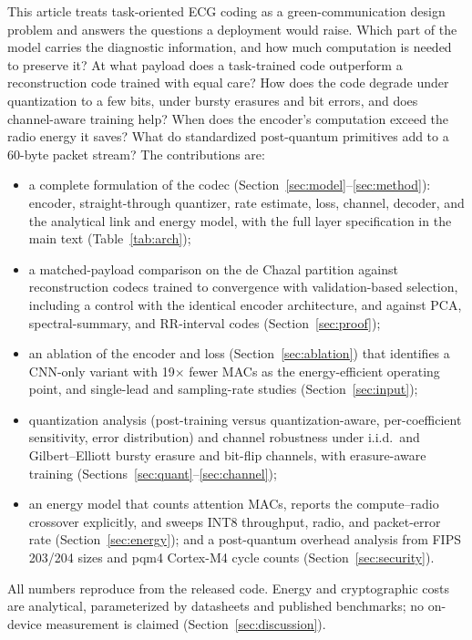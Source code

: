 \documentclass[journal]{IEEEtran}
\begin{document}
This article treats task-oriented ECG coding as a green-communication design problem and answers the questions a deployment would raise. Which part of the model carries the diagnostic information, and how much computation is needed to preserve it? At what payload does a task-trained code outperform a reconstruction code trained with equal care? How does the code degrade under quantization to a few bits, under bursty erasures and bit errors, and does channel-aware training help? When does the encoder's computation exceed the radio energy it saves? What do standardized post-quantum primitives add to a 60-byte packet stream? The contributions are:
\begin{itemize}
\item a complete formulation of the codec (Section~\ref{sec:model}--\ref{sec:method}): encoder, straight-through quantizer, rate estimate, loss, channel, decoder, and the analytical link and energy model, with the full layer specification in the main text (Table~\ref{tab:arch});
\item a matched-payload comparison on the de Chazal partition against reconstruction codecs trained to convergence with validation-based selection, including a control with the identical encoder architecture, and against PCA, spectral-summary, and RR-interval codes (Section~\ref{sec:proof});
\item an ablation of the encoder and loss (Section~\ref{sec:ablation}) that identifies a CNN-only variant with 19$\times$ fewer MACs as the energy-efficient operating point, and single-lead and sampling-rate studies (Section~\ref{sec:input});
\item quantization analysis (post-training versus quantization-aware, per-coefficient sensitivity, error distribution) and channel robustness under i.i.d.\ and Gilbert--Elliott bursty erasure and bit-flip channels, with erasure-aware training (Sections~\ref{sec:quant}--\ref{sec:channel});
\item an energy model that counts attention MACs, reports the compute--radio crossover explicitly, and sweeps INT8 throughput, radio, and packet-error rate (Section~\ref{sec:energy}); and a post-quantum overhead analysis from FIPS 203/204 sizes and pqm4 Cortex-M4 cycle counts (Section~\ref{sec:security}).
\end{itemize}
All numbers reproduce from the released code. Energy and cryptographic costs are analytical, parameterized by datasheets and published benchmarks; no on-device measurement is claimed (Section~\ref{sec:discussion}).
\end{document}

